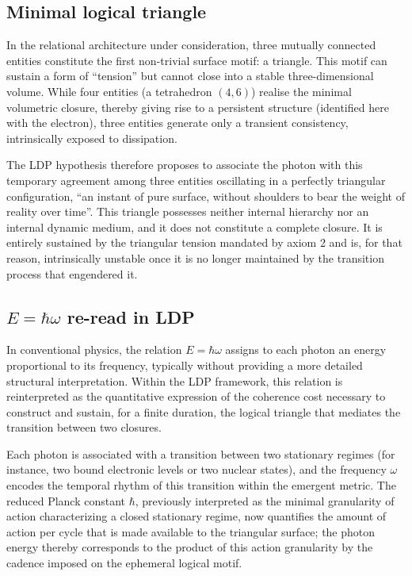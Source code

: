 \documentclass[11pt,a4paper]{article}
\begin{document}
\subsection{Minimal logical triangle}

In the relational architecture under consideration, three mutually connected entities constitute the first non-trivial surface motif: a triangle. This motif can sustain a form of “tension” but cannot close into a stable three-dimensional volume. While four entities (a tetrahedron \((4,6)\)) realise the minimal volumetric closure, thereby giving rise to a persistent structure (identified here with the electron), three entities generate only a transient consistency, intrinsically exposed to dissipation.

The LDP hypothesis therefore proposes to associate the photon with this temporary agreement among three entities oscillating in a perfectly triangular configuration, “an instant of pure surface, without shoulders to bear the weight of reality over time”. This triangle possesses neither internal hierarchy nor an internal dynamic medium, and it does not constitute a complete closure. It is entirely sustained by the triangular tension mandated by axiom 2 and is, for that reason, intrinsically unstable once it is no longer maintained by the transition process that engendered it.

\subsection{\texorpdfstring{\(E = \hbar \omega\)}{E = ħω} re-read in LDP}

In conventional physics, the relation \(E = \hbar \omega\) assigns to each photon an energy proportional to its frequency, typically without providing a more detailed structural interpretation. Within the LDP framework, this relation is reinterpreted as the quantitative expression of the coherence cost necessary to construct and sustain, for a finite duration, the logical triangle that mediates the transition between two closures.

Each photon is associated with a transition between two stationary regimes (for instance, two bound electronic levels or two nuclear states), and the frequency \(\omega\) encodes the temporal rhythm of this transition within the emergent metric. The reduced Planck constant \(\hbar\), previously interpreted as the minimal granularity of action characterizing a closed stationary regime, now quantifies the amount of action per cycle that is made available to the triangular surface; the photon energy thereby corresponds to the product of this action granularity by the cadence imposed on the ephemeral logical motif.
\end{document}
